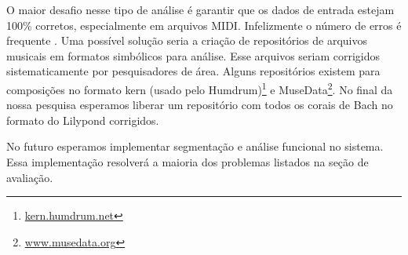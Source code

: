 O maior desafio nesse tipo de análise é garantir que os dados de
entrada estejam 100\% corretos, especialmente em arquivos MIDI.
Infelizmente o número de erros é frequente . Uma possível solução seria a
criação de repositórios de arquivos musicais em formatos simbólicos
para análise. Esse arquivos seriam corrigidos sistematicamente por
pesquisadores de área. Alguns repositórios existem para composições no
formato kern (usado pelo Humdrum)\footnote{\url{kern.humdrum.net}} e
MuseData\footnote{\url{www.musedata.org}}. No final da nossa pesquisa
esperamos liberar um repositório com todos os corais de Bach no
formato do Lilypond corrigidos.

No futuro esperamos implementar segmentação e análise funcional no
sistema. Essa implementação resolverá a maioria dos problemas listados
na seção de avaliação.

